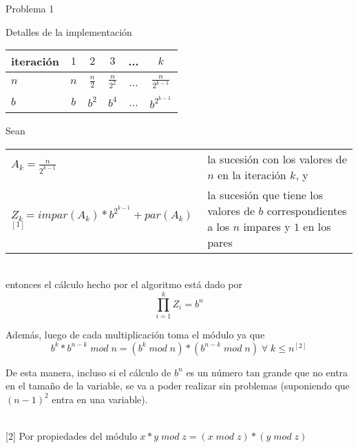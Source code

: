 \begin{section}{Problema 1}
\begin{subsection}{Detalles de la implementación}
		\vspace{0.5cm}
		\begin{center}
		\begin{tabular}{|l|c|c|c|c|c|}
			\hline
			iteración   & $1$ & $2$           & $3$             & ... & $k$ \\
			\hline
			$n$         & $n$ & $\frac{n}{2}$ & $\frac{n}{2^2}$ & ... & $\frac{n}{2^{k-1}}$ \\
			\hline
			$b$         & $b$ & $b^2$         & $b^4$           & ... & $b^{2^{k-1}}$ \\
			\hline
		\end{tabular}
		\end{center}

		\vspace{0.5cm}
		\noindent Sean \\
		\indent
		\begin{tabular}{lp{6cm}}
			$A_k = \frac{n}{2^{k-1}}$ & la sucesión con los valores de $n$ en la iteración $k$, y \\
			$Z_k = impar(A_k) * b^{2^{k-1}} + par( A_k )$ $^{[1]}$ & la sucesión que tiene los valores de $b$ corres\-pondientes a los $n$ impares y $1$ en los pares
		\end{tabular} \\
		\vspace{0.2cm}
		entonces el cálculo hecho por el algoritmo está dado por 
		$$\displaystyle\prod_{i=1}^k Z_i = b^n$$

\noindent Además, luego de cada multiplicación toma el módulo ya que
 $$b^k * b^{n-k}\; mod\;n = (b^k\;mod\;n)*(b^{n-k}\;mod\;n)\;\forall\;k\leq n ^{[2]}$$

De esta manera, incluso si el cálculo de $b^n$ es un número tan grande que no entra en el tamaño de la variable, se va a poder realizar sin problemas (suponiendo que $(n-1)^2$ entra en una variable).

\vspace{0.5cm}
 \\
{\footnotesize [2] Por propiedades del módulo $x*y\; mod \; z = (x\; mod\; z)*(y\; mod\; z)$ } \\



\end{subsection}
\end{section}
